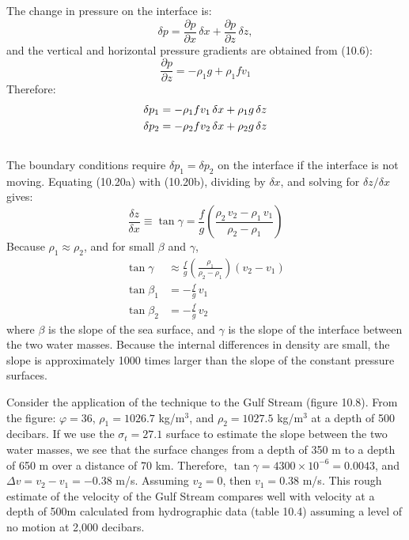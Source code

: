 The change in pressure on the interface is:
\begin{equation}
\delta p = \frac{\partial p}{\partial x}\,\delta x + \frac{\partial p}{\partial
z}\, \delta z ,
\end{equation}
and the vertical and horizontal pressure gradients are obtained from (10.6):
\begin{equation}
\frac{\partial p}{\partial z}= - \rho_1 g + \rho_1 f v_1
\end{equation}
Therefore:
\begin{subequations}
\begin{align}
\delta p_1&=-\rho_1fv_1 \, \delta x + \rho_1 g \, \delta z \\
\delta p_2&=-\rho_2fv_2 \, \delta x + \rho_2 g \, \delta z \\ \notag
\end{align}
\end {subequations}
The boundary conditions require $\delta p_1 = \delta p_2$ on the
interface if the interface is not moving. Equating (10.20a) with
(10.20b), dividing by $\delta x$, and solving for $\delta z/\delta x$
gives:
\begin{displaymath}
\frac{\delta z}{\delta x}\equiv \tan \gamma =\frac{f}{g}\left(\frac{\rho_2\,v_2
- \rho_1\,v_1}{\rho_2 -\rho_1}\right)
\end{displaymath}
Because $\rho_1 \approx \rho_2$, and for small $\beta$ and $\gamma$,
\begin{subequations}
\begin{align}
\tan \gamma &\approx \frac{f}{g}\left(\frac{\rho_1}{\rho_2 - \rho_1}\right)(v_2-v_1) \\
\tan \beta_1&=-\frac{f}{g}\, v_1 \\
\tan \beta_2&=-\frac{f}{g}\, v_2
\end{align}
\end {subequations}
where $\beta$ is the slope of the sea surface, and $\gamma$ is the
slope of the interface between the two water masses. Because the
internal differences in density are small, the slope is approximately
1000 times larger than the slope of the constant pressure surfaces.

Consider the application of the technique to the Gulf
Stream (figure 10.8). From the figure:
$\varphi = 36$\degrees, $\rho_1 = 1026.7$ kg/m$^3$, and $\rho_2 = 1027.5$
kg/m$^3$ at a depth of 500 decibars. If we use the $\sigma_t = 27.1$
surface to estimate the slope between the two water masses, we see
that the surface changes from a depth of 350 m to a depth of 650 m
over a distance of 70 km. Therefore, $\tan \gamma = 4300 \times
10^{-6} = 0.0043$, and $\Delta v = v_2 - v_1 = -0.38$ m/s. Assuming
$v_2 = 0$, then $v_1 = 0.38$ m/s.  This rough estimate of the velocity
of the Gulf Stream compares well with
velocity at a depth of 500m calculated from hydrographic
data (table 10.4) assuming
a level of no motion at 2,000 decibars.

